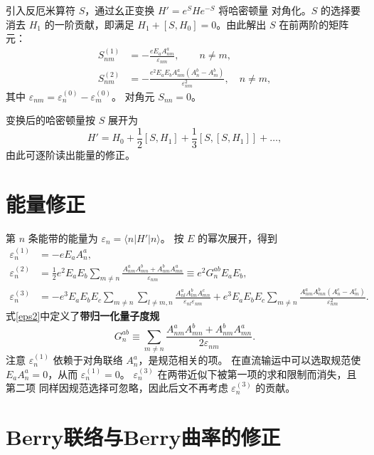 引入反厄米算符 \(S\)，通过幺正变换 \(H' = e^S H e^{-S}\) 将哈密顿量
对角化。\(S\) 的选择要消去 \(H_1\) 的一阶贡献，即满足
\(H_1 + [S, H_0] = 0\)。由此解出 \(S\) 在前两阶的矩阵元：
\begin{align}
  S_{nm}^{(1)} &= -\frac{eE_a A^a_{nm}}{\varepsilon_{nm}}, \qquad n\neq m, \label{S1}\\
  S_{nm}^{(2)} &= -\frac{e^2 E_a E_b A^a_{nm}(A_n^b - A_m^b)}{\varepsilon_{nm}^2}, \quad n\neq m, \label{S2}
\end{align}
其中 \(\varepsilon_{nm} = \varepsilon_n^{(0)} - \varepsilon_m^{(0)}\)。
对角元 \(S_{nn}=0\)。

变换后的哈密顿量按 \(S\) 展开为
\begin{equation}
  H' = H_0 + \frac12 [S,H_1] + \frac13 [S,[S,H_1]] + \dots ,
  \label{Hprime}
\end{equation}
由此可逐阶读出能量的修正。

\section{能量修正}

第 \(n\) 条能带的能量为 \(\varepsilon_n = \langle n|H'|n\rangle\)。
按 \(E\) 的幂次展开，得到
\begin{align}
  \varepsilon_n^{(1)} &= -e E_a A_n^a, \label{eps1}\\
  \varepsilon_n^{(2)} &= \frac12 e^2 E_a E_b
    \sum_{m\neq n} \frac{A^a_{nm}A^b_{mn} + A^b_{nm}A^a_{mn}}{\varepsilon_{nm}}
    \equiv e^2 G_n^{ab} E_a E_b, \label{eps2}\\
  \varepsilon_n^{(3)} &= -e^3 E_a E_b E_c
    \sum_{m\neq n}\sum_{l\neq m,n}
    \frac{A^a_{nl}A^b_{lm}A^c_{mn}}{\varepsilon_{nl}\varepsilon_{nm}}
    + e^3 E_a E_b E_c \sum_{m\neq n}
    \frac{A^a_{nm}A^b_{mn}(A_n^c - A_m^c)}{\varepsilon_{nm}^2}.
    \label{eps3}
\end{align}
式\eqref{eps2}中定义了\textbf{带归一化量子度规}
\begin{equation}
  G_n^{ab} \equiv \sum_{m\neq n}
  \frac{A^a_{nm}A^b_{mn} + A^b_{nm}A^a_{mn}}{2\varepsilon_{nm}}.
  \label{def_G}
\end{equation}
注意 \(\varepsilon_n^{(1)}\) 依赖于对角联络 \(A_n^a\)，是规范相关的项。
在直流输运中可以选取规范使 \(E_a A_n^a = 0\)，从而 \(\varepsilon_n^{(1)} = 0\)。
\(\varepsilon_n^{(3)}\) 在两带近似下被第一项的求和限制而消失，且第二项
同样因规范选择可忽略，因此后文不再考虑 \(\varepsilon_n^{(3)}\) 的贡献。

\section{Berry联络与Berry曲率的修正}

